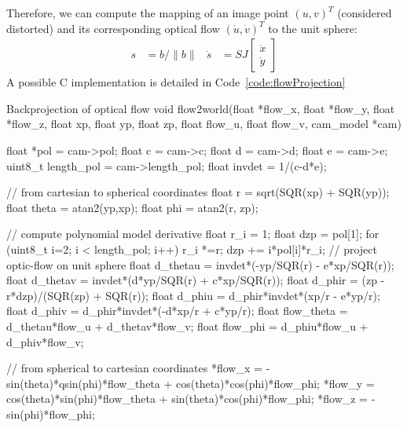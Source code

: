 Therefore, we can compute the mapping of an image point $(u,v)^T$ (considered distorted) and its corresponding optical flow $(\dot{u}, \dot{v})^T$ to the unit sphere:
\begin{align}
s &= b/\|b\| & \dot{s} &= SJ \begin{bmatrix} \dot{x} \\ \dot{y} \end{bmatrix}
\end{align}
A possible C implementation is detailed in Code~\ref{code:flowProjection}

\begin{codeframe}[colback=white, label=code:flowProjection]{Backprojection of optical flow}
void flow2world(float *flow_x, float *flow_y, float *flow_z, 
		float xp, float yp, float zp, float flow_u, 
		float flow_v, cam_model *cam)
{
	 float *pol    = cam->pol;
	 float c       = cam->c;
	 float d       = cam->d;
	 float e       = cam->e;
	 uint8_t length_pol = cam->length_pol;
	 float invdet  = 1/(c-d*e); 
	 
	 // from cartesian to spherical coordinates
	 float r   = sqrt(SQR(xp) + SQR(yp));
	 float theta = atan2(yp,xp);
	 float phi = atan2(r, zp); 
	 
	 // compute polynomial model derivative
	 float r_i = 1;
	 float dzp = pol[1];
	 for (uint8_t i=2; i < length_pol; i++)
	 {
	   r_i *=r;
	   dzp += i*pol[i]*r_i;
	 }
	 // project optic-flow on unit sphere
	 float d_thetau = invdet*(-yp/SQR(r) - e*xp/SQR(r));
	 float d_thetav = invdet*(d*yp/SQR(r) + c*xp/SQR(r));
	 float d_phir = (zp - r*dzp)/(SQR(zp) + SQR(r));
	 float d_phiu = d_phir*invdet*(xp/r - e*yp/r);
	 float d_phiv = d_phir*invdet*(-d*xp/r + c*yp/r);
	 float flow_theta = d_thetau*flow_u 
	 		   + d_thetav*flow_v;
	 float flow_phi = d_phiu*flow_u + d_phiv*flow_v;
	 
	 // from spherical to cartesian coordinates
	 *flow_x = -sin(theta)*qsin(phi)*flow_theta 
	 	   + cos(theta)*cos(phi)*flow_phi;
	 *flow_y = cos(theta)*sin(phi)*flow_theta 
	 	   + sin(theta)*cos(phi)*flow_phi;
	 *flow_z = -sin(phi)*flow_phi;
}
\end{codeframe}

